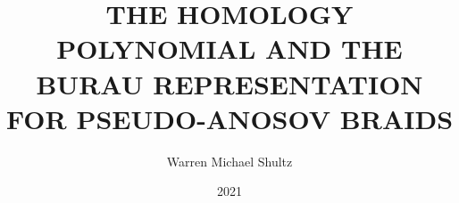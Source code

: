 \documentclass{msu-thesis}
\title{	THE HOMOLOGY POLYNOMIAL AND THE BURAU REPRESENTATION FOR PSEUDO-ANOSOV BRAIDS}
\author{Warren Michael Shultz}
\date{2021}
\begin{document}
\frontmatter

    \begin{abstract}
        
    \end{abstract}



%
%




    \SingleSpacing
    \tableofcontents* %
\clearpage
    \listoftables %
\clearpage
    \listoffigures %
%

\mainmatter






%
\appendix
\end{document}
